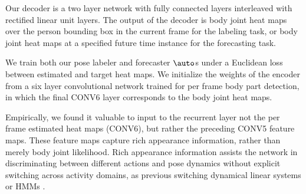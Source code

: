 \documentclass[10pt,twocolumn,letterpaper]{article}
\begin{document}
Our decoder is a two layer network with fully connected layers interleaved with  rectified linear unit layers.  
 The output of the decoder  is    body joint heat maps over the person bounding box in the current frame for the labeling task, or body joint heat maps at a specified future time instance for the forecasting  task. 

We train both our pose labeler and forecaster $\auto$s under a Euclidean loss between estimated and target heat maps. 
We initialize the weights of the encoder from a   six layer convolutional network trained for per frame body part detection, in which the final CONV6 layer corresponds to the body joint heat maps.  %

Empirically, we found it valuable to input to the recurrent layer not the per frame estimated heat maps (CONV6), but rather the preceding CONV5  feature maps.   These feature maps capture rich appearance information, rather than merely  body joint likelihood.  
Rich appearance information  assists the network in discriminating between different actions and pose dynamics without  explicit switching across activity domains, as previous switching dynamical linear systems  or HMMs \cite{prm-lslmh-00}.
\end{document}
